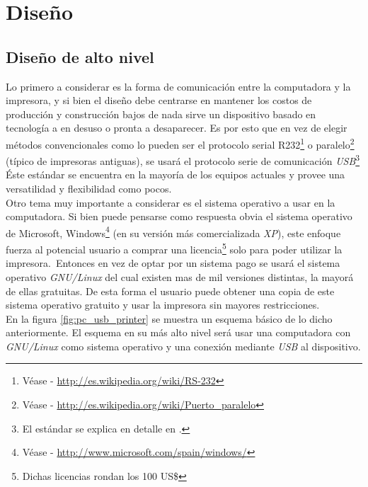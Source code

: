 \chapter{Dise\~no}
%

\section{Dise\~no de alto nivel}
%
Lo primero a considerar es la forma de comunicaci\'on entre la computadora y
la impresora, y si bien el dise\~no debe centrarse en mantener los costos de
producci\'on y construcci\'on bajos de nada sirve un dispositivo basado en
tecnolog\'ia a en desuso o pronta a desaparecer. Es por esto que en vez de
elegir m\'etodos convencionales como lo pueden ser el protocolo serial
R232\footnote{V\'ease - \url{http://es.wikipedia.org/wiki/RS-232}} o
paralelo\footnote{V\'ease - \url{http://es.wikipedia.org/wiki/Puerto_paralelo}}
(t\'ipico de impresoras antiguas), se usar\'a el protocolo serie de
comunicaci\'on \emph{USB}\footnote{El est\'andar se explica en detalle en
.} \'Este est\'andar se encuentra en la mayor\'ia de los
equipos actuales y provee una versatilidad y flexibilidad como pocos.\\

Otro tema muy importante a considerar es el sistema operativo a usar en la
computadora. Si bien puede pensarse como respuesta obvia el sistema operativo
de Microsoft,
Windows\footnote{V\'ease - \url{http://www.microsoft.com/spain/windows/}} (en
su versi\'on m\'as comercializada \emph{XP}), este enfoque fuerza al potencial
usuario a comprar una licencia\footnote{Dichas licencias rondan los 100 US\$}
solo para poder utilizar la impresora.\
Entonces en vez de optar por un sistema pago se usar\'a el sistema
operativo \emph{GNU/Linux}
del cual existen mas de mil versiones distintas, la mayor\'a de ellas
gratuitas.
De esta forma el usuario puede obtener una copia de este sistema operativo
gratuito y usar la impresora sin mayores restricciones.\\

En la figura \ref{fig:pc_usb_printer} se muestra un esquema b\'asico de lo
dicho
anteriormente. El esquema en su m\'as alto nivel ser\'a usar una computadora
con \emph{GNU/Linux} como sistema operativo y una conexi\'on mediante
\emph{USB} al dispositivo.

